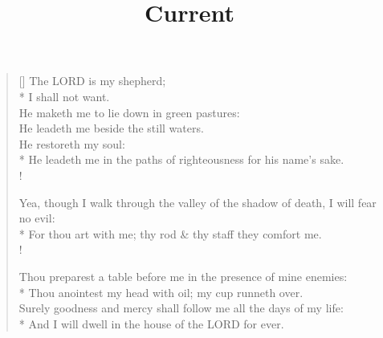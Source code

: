 \documentclass{amsart}
\title{Current}
\begin{document}
\settowidth{\versewidth}{\vin He leadeth me in the paths of righteousness for his name's sake.}
\begin{verse}[\versewidth]
The {\hoskeroe LORD} is my shepherd;\\*
\vin I shall not want.\\
He maketh me to lie down in green pastures:\\
\vin He leadeth me beside the still waters.\\
He restoreth my soul:\\*
\vin He leadeth me in the paths of righteousness for his name's sake.\\!

Yea, though I walk through the valley of the shadow of death, I will fear no evil:\\*
\vin For thou art with me; thy rod \& thy staff they comfort me.\\!

Thou preparest a table before me in the presence of mine enemies:\\*
\vin Thou anointest my head with oil; my cup runneth over.\\
Surely goodness and mercy shall follow me all the days of my life:\\*
\vin And I will dwell in the house of the {\hoskeroe LORD} for ever.
\end{verse}
\end{document}
